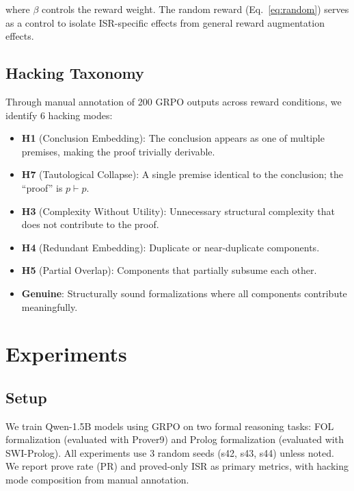 \documentclass[11pt,a4paper]{article}
\newcommand{\isr}{\textsc{ISR}}
\newcommand{\pr}{\textsc{PR}}
\begin{document}
where $\beta$ controls the reward weight.
The random reward (Eq.~\ref{eq:random}) serves as a control to isolate \isr{}-specific effects from general reward augmentation effects.

\subsection{Hacking Taxonomy}
\label{sec:taxonomy_method}

Through manual annotation of 200 GRPO outputs across reward conditions, we identify 6 hacking modes:

\begin{itemize}[nosep]
\item \textbf{H1} (Conclusion Embedding): The conclusion appears as one of multiple premises, making the proof trivially derivable.
\item \textbf{H7} (Tautological Collapse): A single premise identical to the conclusion; the ``proof'' is $p \vdash p$.
\item \textbf{H3} (Complexity Without Utility): Unnecessary structural complexity that does not contribute to the proof.
\item \textbf{H4} (Redundant Embedding): Duplicate or near-duplicate components.
\item \textbf{H5} (Partial Overlap): Components that partially subsume each other.
\item \textbf{Genuine}: Structurally sound formalizations where all components contribute meaningfully.
\end{itemize}


\section{Experiments}
\label{sec:experiments}

\subsection{Setup}

We train Qwen-1.5B models using GRPO on two formal reasoning tasks: FOL formalization (evaluated with Prover9) and Prolog formalization (evaluated with SWI-Prolog).
All experiments use 3 random seeds (s42, s43, s44) unless noted.
We report prove rate (\pr{}) and proved-only \isr{} as primary metrics, with hacking mode composition from manual annotation.
\end{document}
